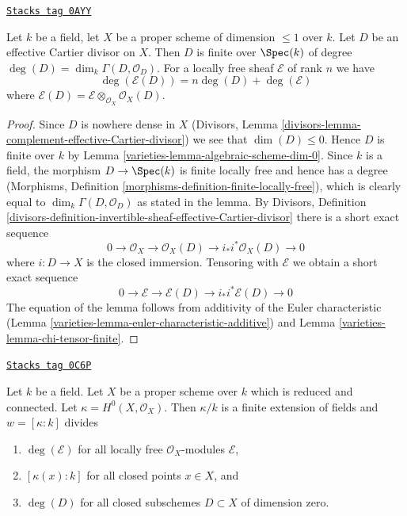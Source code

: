 \begin{lemma}
\label{varieties-lemma-degree-effective-Cartier-divisor}
\href{https://stacks.math.columbia.edu/tag/0AYY}{\texttt{Stacks tag 0AYY}}

Let $k$ be a field, let $X$ be a proper scheme of dimension $\leq 1$
over $k$. Let $D$ be an effective Cartier divisor on $X$.
Then $D$ is finite over $\Spec(k)$ of degree
$\deg(D) = \dim_k \Gamma(D, \mathcal{O}_D)$. For a locally free sheaf
$\mathcal{E}$ of rank $n$ we have
$$
\deg(\mathcal{E}(D)) = n\deg(D) + \deg(\mathcal{E})
$$
where $\mathcal{E}(D) = \mathcal{E} \otimes_{\mathcal{O}_X} \mathcal{O}_X(D)$.
\end{lemma}

\begin{proof}

Since $D$ is nowhere dense in $X$ (Divisors, Lemma
\ref{divisors-lemma-complement-effective-Cartier-divisor})
we see that $\dim(D) \leq 0$. Hence $D$ is finite over $k$
by Lemma \ref{varieties-lemma-algebraic-scheme-dim-0}. Since $k$ is a field,
the morphism $D \to \Spec(k)$ is finite locally free and hence has
a degree
(Morphisms, Definition \ref{morphisms-definition-finite-locally-free}),
which is clearly equal to $\dim_k \Gamma(D, \mathcal{O}_D)$
as stated in the lemma. By
Divisors, Definition
\ref{divisors-definition-invertible-sheaf-effective-Cartier-divisor}
there is a short exact sequence
$$
0 \to \mathcal{O}_X \to \mathcal{O}_X(D) \to i_*i^*\mathcal{O}_X(D) \to 0
$$
where $i : D \to X$ is the closed immersion. Tensoring with $\mathcal{E}$
we obtain a short exact sequence
$$
0 \to \mathcal{E} \to \mathcal{E}(D) \to i_*i^*\mathcal{E}(D) \to 0
$$
The equation of the lemma follows from additivity of
the Euler characteristic (Lemma \ref{varieties-lemma-euler-characteristic-additive})
and Lemma \ref{varieties-lemma-chi-tensor-finite}.
\end{proof}

\begin{lemma}[Divisible]
\label{varieties-lemma-divisible}
\href{https://stacks.math.columbia.edu/tag/0C6P}{\texttt{Stacks tag 0C6P}}

Let $k$ be a field. Let $X$ be a proper scheme over $k$
which is reduced and connected.
Let $\kappa = H^0(X, \mathcal{O}_X)$. Then $\kappa/k$ is a
finite extension of fields and $w = [\kappa : k]$ divides
\begin{enumerate}
\item $\deg(\mathcal{E})$ for all locally free $\mathcal{O}_X$-modules
$\mathcal{E}$,
\item $[\kappa(x) : k]$ for all closed points $x \in X$, and
\item $\deg(D)$ for all closed subschemes $D \subset X$
of dimension zero.
\end{enumerate}
\end{lemma}

